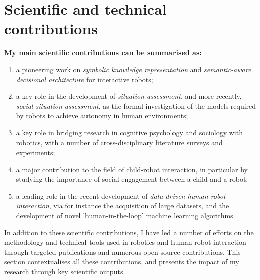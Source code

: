 \section{Scientific and technical contributions}
\label{sci-contribs}


\begin{framed}

    \vspace{1em}
\noindent\bf My main scientific contributions can be summarised as:

    \vspace{1em}
\begin{enumerate}
    \item a pioneering work on \emph{symbolic knowledge representation} and
        \emph{semantic-aware decisional architecture} for interactive robots;

    \item a key role in the development of \emph{situation assessment}, and more
        recently, \emph{social situation assessment}, as the formal
        investigation of the models required by robots to achieve autonomy in
        human environments;

    \item a key role in bridging research in cognitive psychology and sociology with robotics,
        with a number of cross-disciplinary literature surveys and experiments;

    \item a major contribution to the field of child-robot interaction, in
        particular by studying the importance of social engagement between
        a child and a robot;

    \item a leading role in the recent development of \emph{data-driven
        human-robot interaction}, via for instance the acquisition of large
        datasets, and the development of novel 'human-in-the-loop' machine
        learning algorithms.

\end{enumerate}

\vspace{1em}

\noindent In addition to these scientific contributions, I have led a number of
efforts on the methodology and technical tools used in robotics and human-robot
interaction through targeted publications and numerous open-source contributions.
This section contextualises all these contributions, and presents the impact of my
research through key scientific outputs.

    \vspace{1em}
\end{framed}

